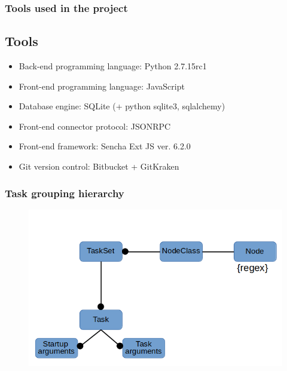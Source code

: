 \documentclass{beamer}
\begin{document}
\begin{frame}
\frametitle{Tools used in the project}
\subsection{Tools}

\begin{itemize}
\item Back-end programming language: Python 2.7.15rc1
\item Front-end programming language: JavaScript
\item Database engine: SQLite (+ python sqlite3, sqlalchemy)
\item Front-end connector protocol: JSONRPC
\item Front-end framework: Sencha Ext JS ver. 6.2.0
\item Git version control: Bitbucket + GitKraken
\end{itemize}

\end{frame}











\ThankYouFrame


\begin{frame}
\frametitle{Task grouping hierarchy}
\begin{figure}[H]
    	\centering
    	\includegraphics[scale=0.4]{hierarchy.png}
\end{figure}
\end{frame}





\end{document}
